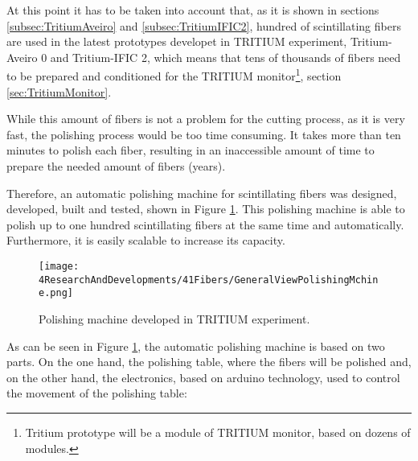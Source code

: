 At this point it has to be taken into account that, as it is shown in sections \ref{subsec:TritiumAveiro} and \ref{subsec:TritiumIFIC2}, hundred of scintillating fibers are used in the latest prototypes developet in TRITIUM experiment, Tritium-Aveiro 0 and Tritium-IFIC 2, which means that tens of thousands of fibers  need to be prepared and conditioned for the TRITIUM monitor\footnote{Tritium prototype will be a module of TRITIUM monitor, based on dozens of modules.}, section \ref{sec:TritiumMonitor}.

While this amount of fibers is not a problem for the cutting process, as it is very fast, the polishing process would be too time consuming. It takes more than ten minutes to polish each fiber, resulting in an inaccessible amount of time to prepare the needed amount of fibers (years).

Therefore, an automatic polishing machine for scintillating fibers was designed, developed, built and tested, shown in Figure \ref{fig:GeneralViewPolishingMachine}. This polishing machine is able to polish up to one hundred scintillating fibers at the same time and automatically. Furthermore, it is easily scalable to increase its capacity.


\begin{figure}[h]
\centering
\texttt{[image: 4ResearchAndDevelopments/41Fibers/GeneralViewPolishingMchine.png]}
\caption{Polishing machine developed in TRITIUM experiment.\label{fig:GeneralViewPolishingMachine}}
\end{figure}

As can be seen in Figure \ref{fig:GeneralViewPolishingMachine}, the automatic polishing machine is based on two parts. On the one hand, the polishing table, where the fibers will be polished and, on the other hand, the electronics, based on arduino technology, used to control the movement of the polishing table:

